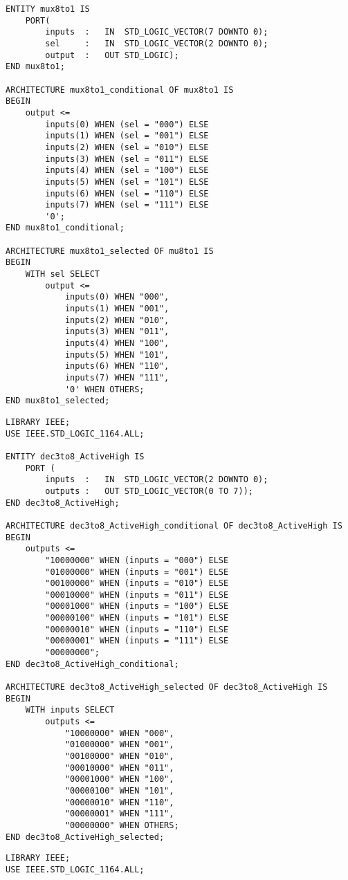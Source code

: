 \begin{enumerate}
\begin{minipage}{1\linewidth}
\begin{lstlisting}
ENTITY mux8to1 IS
	PORT(
		inputs	:	IN	STD_LOGIC_VECTOR(7 DOWNTO 0);
		sel		:	IN	STD_LOGIC_VECTOR(2 DOWNTO 0);
		output	:	OUT	STD_LOGIC);
END mux8to1;

ARCHITECTURE mux8to1_conditional OF mux8to1 IS
BEGIN
	output <=
		inputs(0) WHEN (sel = "000") ELSE
		inputs(1) WHEN (sel = "001") ELSE
		inputs(2) WHEN (sel = "010") ELSE
		inputs(3) WHEN (sel = "011") ELSE
		inputs(4) WHEN (sel = "100") ELSE
		inputs(5) WHEN (sel = "101") ELSE
		inputs(6) WHEN (sel = "110") ELSE
		inputs(7) WHEN (sel = "111") ELSE
		'0';
END mux8to1_conditional;

ARCHITECTURE mux8to1_selected OF mu8to1 IS
BEGIN
	WITH sel SELECT
		output <=
			inputs(0) WHEN "000",
			inputs(1) WHEN "001",
			inputs(2) WHEN "010",
			inputs(3) WHEN "011",
			inputs(4) WHEN "100",
			inputs(5) WHEN "101",
			inputs(6) WHEN "110",
			inputs(7) WHEN "111",
			'0' WHEN OTHERS;
END mux8to1_selected;
		\end{lstlisting}
	\end{minipage}

	\begin{minipage}{1\linewidth}
		\item
		\begin{lstlisting}
LIBRARY IEEE;
USE IEEE.STD_LOGIC_1164.ALL;

ENTITY dec3to8_ActiveHigh IS
	PORT (
		inputs	:	IN	STD_LOGIC_VECTOR(2 DOWNTO 0);
		outputs	:	OUT	STD_LOGIC_VECTOR(0 TO 7));
END dec3to8_ActiveHigh;

ARCHITECTURE dec3to8_ActiveHigh_conditional OF dec3to8_ActiveHigh IS
BEGIN
	outputs <=
		"10000000" WHEN (inputs = "000") ELSE
		"01000000" WHEN (inputs = "001") ELSE
		"00100000" WHEN (inputs = "010") ELSE
		"00010000" WHEN (inputs = "011") ELSE
		"00001000" WHEN (inputs = "100") ELSE
		"00000100" WHEN (inputs = "101") ELSE
		"00000010" WHEN (inputs = "110") ELSE
		"00000001" WHEN (inputs = "111") ELSE
		"00000000";
END dec3to8_ActiveHigh_conditional;

ARCHITECTURE dec3to8_ActiveHigh_selected OF dec3to8_ActiveHigh IS
BEGIN
	WITH inputs SELECT
		outputs <=
			"10000000" WHEN "000",
			"01000000" WHEN "001",
			"00100000" WHEN "010",
			"00010000" WHEN "011",
			"00001000" WHEN "100",
			"00000100" WHEN "101",
			"00000010" WHEN "110",
			"00000001" WHEN "111",
			"00000000" WHEN OTHERS;
END dec3to8_ActiveHigh_selected;
		\end{lstlisting}
	\end{minipage}

	\begin{minipage}{1\linewidth}
		\item
		\begin{lstlisting}
LIBRARY IEEE;
USE IEEE.STD_LOGIC_1164.ALL;


\end{lstlisting}
\end{minipage}
\end{enumerate}
